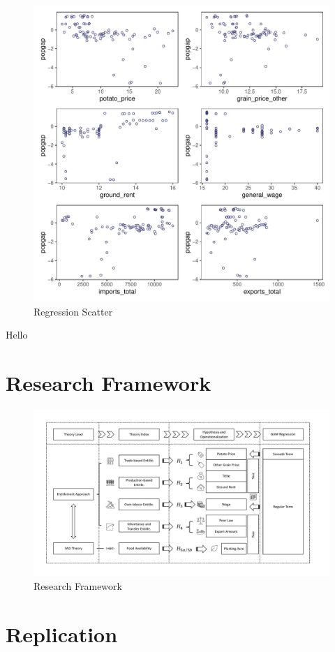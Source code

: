 \begin{figure}[htbp]
    \centering
    \caption{Regression Scatter}
    \includegraphics[width=.95\textwidth]{../03_outputs/regression_scatter.pdf}
\end{figure}

Hello

\section{Research Framework}
\begin{landscape}
    \begin{figure}[htbp]
        \centering
        \caption{Research Framework}
        \includegraphics[width=1.5\textheight]{../03_outputs/Framework.pdf}
    \end{figure}
\end{landscape}

\section{Replication}
